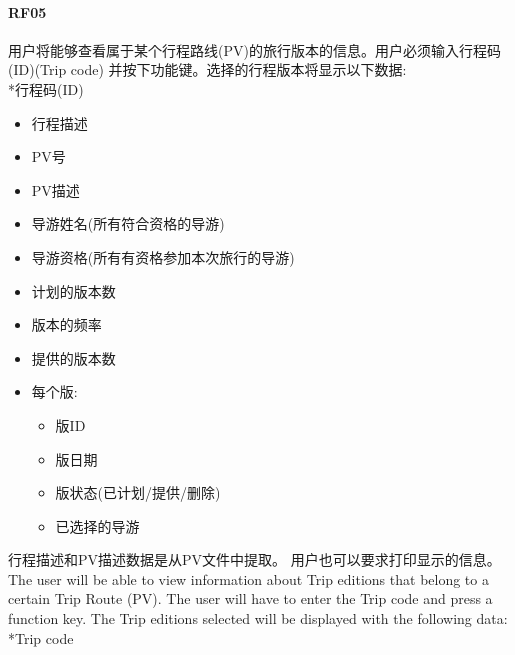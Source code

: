 \hypertarget{rf05-2}{%
\paragraph{RF05}\label{rf05-2}}

用户将能够查看属于某个行程路线(PV)的旅行版本的信息。用户必须输入行程码(ID)(Trip
code) 并按下功能键。选择的行程版本将显示以下数据:\\
*行程码(ID)

\begin{itemize}
\tightlist
\item
  行程描述
\item
  PV号
\item
  PV描述
\item
  导游姓名(所有符合资格的导游)
\item
  导游资格(所有有资格参加本次旅行的导游)
\item
  计划的版本数
\item
  版本的频率
\item
  提供的版本数
\item
  每个版:

  \begin{itemize}
  \tightlist
  \item
    版ID
  \item
    版日期
  \item
    版状态(已计划/提供/删除)
  \item
    已选择的导游\\
  \end{itemize}
\end{itemize}

行程描述和PV描述数据是从PV文件中提取。 用户也可以要求打印显示的信息。\\
The user will be able to view information about Trip editions that
belong to a certain Trip Route (PV). The user will have to enter the
Trip code and press a function key. The Trip editions selected will be
displayed with the following data:\\
*Trip code

